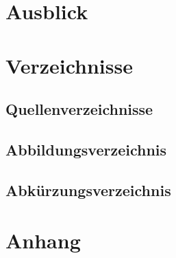 \documentclass[11pt]{article}
\begin{document}
\section{Ausblick}

\section{Verzeichnisse}
\subsection{Quellenverzeichnisse}
\subsection{Abbildungsverzeichnis}
\subsection{Abkürzungsverzeichnis}

\section{Anhang}


\end{document}
